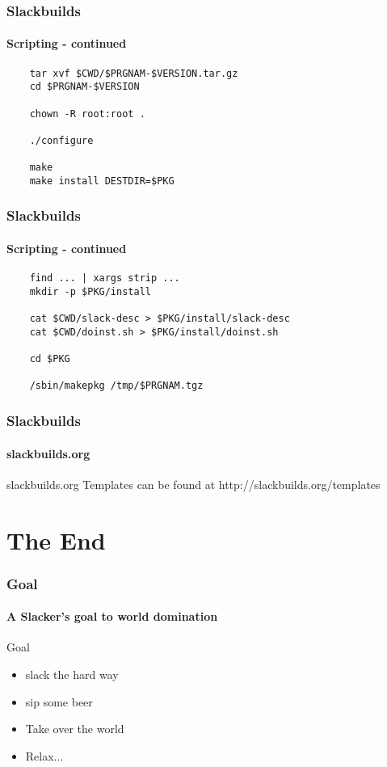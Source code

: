 \documentclass[1pt,hyperref={pdfpagelabels=true}]{beamer}
\begin{document}
\begin{frame}[fragile]
  \frametitle{Slackbuilds}
  \framesubtitle{Scripting - continued}
  
  \begin{lstlisting}
    tar xvf $CWD/$PRGNAM-$VERSION.tar.gz
    cd $PRGNAM-$VERSION
    
    chown -R root:root .
    
    ./configure
    
    make
    make install DESTDIR=$PKG
  \end{lstlisting}
  
\end{frame}

\begin{frame}[fragile]
  \frametitle{Slackbuilds}
  \framesubtitle{Scripting - continued}

  \begin{lstlisting}
    find ... | xargs strip ...
    mkdir -p $PKG/install
    
    cat $CWD/slack-desc > $PKG/install/slack-desc
    cat $CWD/doinst.sh > $PKG/install/doinst.sh
    
    cd $PKG
    
    /sbin/makepkg /tmp/$PRGNAM.tgz
  \end{lstlisting}
  
\end{frame}

\begin{frame}
  \frametitle{Slackbuilds}
  \framesubtitle{slackbuilds.org}

    \begin{block}{slackbuilds.org}
      Templates can be found at
      http://slackbuilds.org/templates
    \end{block}

\end{frame}

\section{The End}

\begin{frame}
  \frametitle{Goal}
  \framesubtitle{A Slacker's goal to world domination}
  
  \begin{block}{Goal}
    \begin{itemize}[<+-| alert@+>]
    \item slack the hard way
    \item sip some beer
    \item Take over the world
    \item Relax...
    \end{itemize}
  \end{block}
  
\end{frame}
\end{document}
